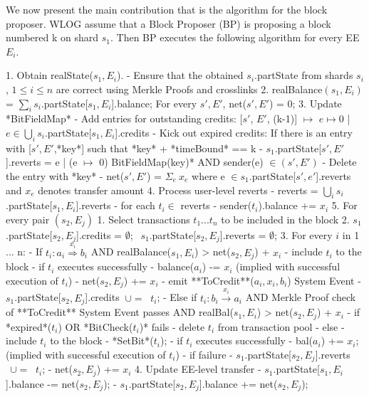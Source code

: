 \documentclass{article}
\begin{document}
We now present the main contribution that is the algorithm for the block proposer. WLOG assume that a Block Proposer (BP) is proposing a block numbered k on shard $s_1$. Then BP executes the following algorithm for every EE $E_i$.

1. Obtain realState($s_1, E_i$). 
	- Ensure that the obtained $s_i$.partState from shards $s_i$, $1 \le i \le n$ are correct using Merkle Proofs and crosslinks
2. realBalance$(s_1,E_i)$ = $\sum_i s_i$.partState[$s_1,E_i$].balance;
For every $s',E'$, net($s',E'$) = 0;  
3. Update *BitFieldMap*
	- Add entries for outstanding credits: 
[$s'$, $E'$, (k-1)] $\mapsto$ {$e \mapsto 0$ | $e \in \bigcup_i s_i$.partState[$s_1,E_i$].credits}
	- Kick out expired credits: If there is an entry with [$s',E'$,*key*] such that *key* + *timeBound* == k
		- $s_1$.partState[$s',E'$].reverts = { e | (e $\mapsto$ 0) \in *BitFieldMap(key)* AND sender(e) $\in (s',E')$ }
		- Delete the entry with *key*
		- net($s',E'$) = $\Sigma_e ~x_e$ where e $\in s_1$.partState[$s',e'$].reverts and $x_e$ denotes transfer amount
4. Process user-level reverts
	- reverts = $\bigcup_i s_i$.partState[$s_1,E_i$].reverts
	- for each $t_i \in$ reverts
		- sender($t_i$).balance += $x_i$
5. For every pair $(s_2,E_j)$
	1. Select transactions $t_1...t_n$ to be included in the block
	2. $s_1$.partState[$s_2,E_j$].credits = $\emptyset$;  $~~s_1$.partState[$s_2,E_j$].reverts = $\emptyset$; 
	3. For every $i$ in 1 ... n: 
		- If $t_i : a_i \stackrel{x_i}{\Longrightarrow} b_i$ AND realBalance($s_1,E_i$) > net($s_2,E_j$) + $x_i$
			- include $t_i$ to the block
			- if $t_i$ executes successfully 
				- balance($a_i$) -= $x_i$ (implied with successful execution of $t_i$)
				- net($s_2,E_j$) += $x_i$
				- emit **ToCredit**($a_i, x_i, b_i$) System Event
				- $s_1$.partState[$s_2,E_j$].credits $~ \cup= ~$ {$t_i$};
		- Else if $t_i : b_i \stackrel{x_i}{\longrightarrow} a_i$ AND Merkle Proof check of **ToCredit** System Event passes AND realBal($s_1,E_i$) > net($s_2,E_j$) + $x_i$
			- if *expired*($t_i$) OR *BitCheck($t_i$)* fails
				- delete $t_i$ from transaction pool
			- else 
				- include $t_i$ to the block
				- *SetBit*($t_i$);
				- if $t_i$ executes successfully
					- bal($a_i$) += $x_i$; (implied with successful execution of $t_i$)
				- if failure 
					- $s_1$.partState[$s_2,E_j$].reverts $~~\cup=~$ {$t_i$};
					- net($s_2,E_j$) += $x_i$ 
	4. Update EE-level transfer
		- $s_1$.partState[$s_1,E_i$].balance -= net($s_2,E_j$); 
		- $s_1$.partState[$s_2,E_j$].balance += net($s_2,E_j$);
\end{document}
